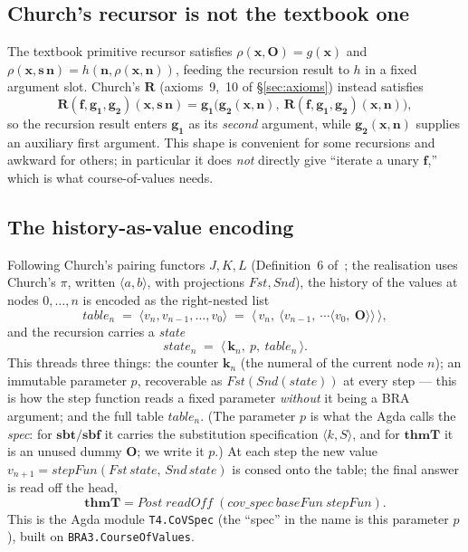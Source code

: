 \documentclass[11pt]{article}
\theoremstyle{plain}
\theoremstyle{definition}
\theoremstyle{remark}
\newcommand{\sbf}{\mathbf{sbf}}
\newcommand{\sbt}{\mathbf{sbt}}
\newcommand{\thmT}{\mathbf{thmT}}
\newcommand{\seq}[1]{\langle #1 \rangle}
\begin{document}
\subsection{Church's recursor is not the textbook one}

The textbook primitive recursor satisfies $\rho(\mathbf{x},\mathbf{O}) =
g(\mathbf{x})$ and $\rho(\mathbf{x},\mathbf{s}\,\mathbf{n}) =
h(\mathbf{n}, \rho(\mathbf{x},\mathbf{n}))$, feeding the recursion result
to $h$ in a fixed argument slot.  Church's $\mathbf{R}$ (axioms~9,~10 of
{\S}\ref{sec:axioms}) instead satisfies
\[
\mathbf{R}(\mathbf{f},\mathbf{g_1},\mathbf{g_2})(\mathbf{x},\mathbf{s}\,\mathbf{n}) = \mathbf{g_1}\bigl(\mathbf{g_2}(\mathbf{x},\mathbf{n}),\ \mathbf{R}(\mathbf{f},\mathbf{g_1},\mathbf{g_2})(\mathbf{x},\mathbf{n})\bigr),
\]
so the recursion result enters $\mathbf{g_1}$ as its \emph{second}
argument, while $\mathbf{g_2}(\mathbf{x},\mathbf{n})$ supplies an
auxiliary first argument.  This shape is convenient for some recursions
and awkward for others; in particular it does \emph{not} directly give
``iterate a unary $\mathbf{f}$,'' which is what course-of-values needs.

\subsection{The history-as-value encoding}

Following Church's pairing functors $J,K,L$ (Definition~6
of~\cite{Guard1963}; the realisation uses Church's $\pi$, written
$\seq{a,b}$, with projections $\mathit{Fst},\mathit{Snd}$), the history of
the values at nodes $0,\ldots,n$ is encoded as the right-nested list
\[
\mathit{table}_n \;=\; \seq{v_n, v_{n-1}, \ldots, v_0} \;=\; \seq{\,v_n,\ \seq{v_{n-1},\ \cdots \seq{v_0,\ \mathbf{O}}}\,},
\]
and the recursion carries a \emph{state}
\[
\mathit{state}_n \;=\; \seq{\,\mathbf{k}_n,\ p,\ \mathit{table}_n\,}.
\]
This threads three things: the counter $\mathbf{k}_n$ (the numeral of the
current node $n$); an immutable parameter $p$, recoverable as
$\mathit{Fst}(\mathit{Snd}(\mathit{state}))$ at every step --- this is how
the step function reads a fixed parameter \emph{without} it being a BRA
argument; and the full table $\mathit{table}_n$.  (The parameter $p$ is
what the Agda calls the \emph{spec}: for $\sbt/\sbf$ it carries the
substitution specification $\seq{k,S}$, and for $\thmT$ it is an unused
dummy $\mathbf{O}$; we write it $p$.)  At each step the new value
$v_{n+1} = \mathit{stepFun}(\mathit{Fst}\,\mathit{state},\,
\mathit{Snd}\,\mathit{state})$ is consed onto the table; the final answer
is read off the head,
\[
\thmT = \mathit{Post}\;\mathit{readOff}\;(\mathit{cov\_spec}\ \mathit{baseFun}\ \mathit{stepFun}).
\]
This is the Agda module \verb|T4.CoVSpec| (the ``spec'' in the name is
this parameter $p$), built on \verb|BRA3.CourseOfValues|.
\end{document}
